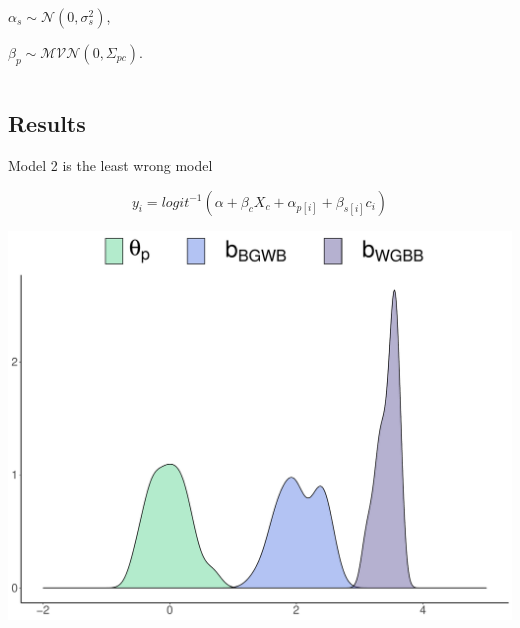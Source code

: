 \documentclass[compress]{beamer}
\begin{document}
\begin{frame}
	\begin{centering}
		$\alpha_s \sim \mathcal{N}(0, \sigma_s^2)$,
		
	\end{centering}
	
	\begin{centering}
		
		$\beta_p \sim \mathcal{MVN}(0, \Sigma_{pc})$.
		
	\end{centering}
	
	
	\vspace{1.5mm}
	
	
		\vspace{1.5mm}
\pause
\begin{columns}[T]
	\begin{column}{.50\linewidth}
		\centering
		
		
	\end{column}
		\begin{column}{.50\linewidth}
				\centering
	
	\end{column}
\end{columns}
\end{frame}

\subsection{Results}

\begin{frame}{Model 2 is the least wrong model}
	
		\begin{equation*}\label{Accuracy5}
		y_{i} = logit^{-1}(\alpha + \beta_c X_c +  \alpha_{p[i]} +  \beta_{s[i]}c_{i})
	\end{equation*}
	
	\centering
	\includegraphics[width=0.6\linewidth]{img/raceParaccuracy.pdf}
\end{frame}
\end{document}
